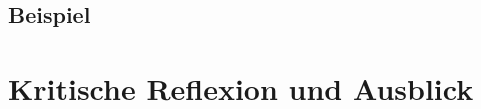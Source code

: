 \documentclass[12pt]{report}
\begin{document}
\pagebreak
\section{Beispiel}
\blindtext


\newpage
\chapter{Kritische Reflexion und Ausblick}
\blindtext


\setcounter{page}{8}
\newpage
{}

\renewcommand{\refname}{Literaturverzeichnis}


\end{document}
